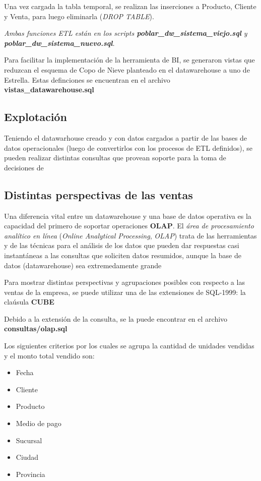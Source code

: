 Una vez cargada la tabla temporal, se realizan las inserciones a Producto, Cliente y Venta, para luego eliminarla (\emph{DROP TABLE}).

\emph{Ambas funciones ETL están en los \emph{scripts} \textbf{poblar\_dw\_sistema\_viejo.sql} \newline y \textbf{poblar\_dw\_sistema\_nuevo.sql}.}

Para facilitar la implementación de la herramienta de BI, se generaron vistas que reduzcan el esquema de Copo de Nieve planteado en el datawarehouse a uno de Estrella. Estas definciones se encuentran en el archivo \textbf{vistas\_datawarehouse.sql}

\subsection{Explotación}

Teniendo el datawarhouse creado y con datos cargados a partir de las bases de datos operacionales (luego de convertirlos con los procesos de ETL definidos), se pueden realizar distintas consultas que provean soporte para la toma de decisiones de 

\subsection{Distintas perspectivas de las ventas}

Una diferencia vital entre un datawarehouse y una base de datos operativa es la capacidad del primero de soportar operaciones \textbf{OLAP}. El \emph{área de procesamiento analítico en línea} (\emph{Online Analytical Processing}, \emph{OLAP}) trata de las herramientas y de las técnicas para el análisis de los datos que pueden dar respuestas casi instantáneas a las consultas que soliciten datos resumidos, aunque la base de datos (datawarehouse) sea extremedamente grande \autocite{silberschatz-olap}

Para mostrar distintas perspectivas y agrupaciones posibles con respecto a las ventas de la empresa, se puede utilizar una de las extensiones de SQL-1999: la claúsula \textbf{CUBE} 

Debido a la extensión de la consulta, se la puede encontrar en el archivo \textbf{consultas/olap.sql} 

Los siguientes criterios por los cuales se agrupa la cantidad de unidades vendidas y el monto total vendido son:

\begin{itemize}
    \item Fecha
    \item Cliente
    \item Producto
    \item Medio de pago
    \item Sucursal
    \item Ciudad
    \item Provincia
\end{itemize}


